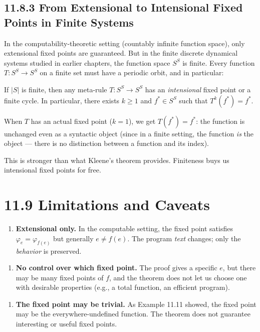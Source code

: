 \subsection{11.8.3 From Extensional to Intensional Fixed Points in Finite Systems}

In the computability-theoretic setting (countably infinite function space), only extensional fixed points are guaranteed. But in the finite discrete dynamical systems studied in earlier chapters, the function space $S^S$ is finite. Every function $T: S^S \to S^S$ on a finite set must have a periodic orbit, and in particular:

\begin{proposition}
If $|S|$ is finite, then any meta-rule $T: S^S \to S^S$ has an \textit{intensional} fixed point or a finite cycle. In particular, there exists $k \geq 1$ and $f^* \in S^S$ such that $T^k(f^*) = f^*$.

When $T$ has an actual fixed point ($k = 1$), we get $T(f^*) = f^*$: the function is unchanged even as a syntactic object (since in a finite setting, the function \textit{is} the object --- there is no distinction between a function and its index).

This is stronger than what Kleene's theorem provides. Finiteness buys us intensional fixed points for free.
\end{proposition}

\section{11.9 Limitations and Caveats}

\begin{enumerate}
  \item \textbf{Extensional only.} In the computable setting, the fixed point satisfies $\varphi_e = \varphi_{f(e)}$ but generally $e \neq f(e)$. The program \textit{text} changes; only the \textit{behavior} is preserved.
\end{enumerate}

\begin{enumerate}
  \item \textbf{No control over which fixed point.} The proof gives a specific $e$, but there may be many fixed points of $f$, and the theorem does not let us choose one with desirable properties (e.g., a total function, an efficient program).
\end{enumerate}

\begin{enumerate}
  \item \textbf{The fixed point may be trivial.} As Example 11.11 showed, the fixed point may be the everywhere-undefined function. The theorem does not guarantee interesting or useful fixed points.
\end{enumerate}

